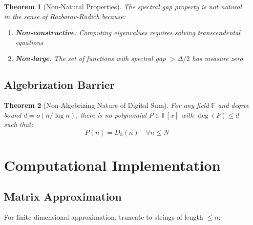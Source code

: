 \documentclass[12pt]{article}
\theoremstyle{plain}
\newtheorem{theorem}{Theorem}[section]
\theoremstyle{definition}
\newcommand{\F}{\mathbb{F}}
\newcommand{\digitalsum}{D}
\begin{document}
\begin{theorem}[Non-Natural Properties]
\label{thm:non_natural}
The spectral gap property is not natural in the sense of Razborov-Rudich because:
\begin{enumerate}
\item \textbf{Non-constructive}: Computing eigenvalues requires solving transcendental equations
\item \textbf{Non-large}: The set of functions with spectral gap $> \Delta/2$ has measure zero
\end{enumerate}
\end{theorem}

\subsection{Algebrization Barrier}

\begin{theorem}[Non-Algebrizing Nature of Digital Sum]
\label{thm:non_algebrizing}
For any field $\F$ and degree bound $d = o(n/\log n)$, there is no polynomial $P \in \F[x]$ with $\deg(P) \leq d$ such that:
\begin{equation}
P(n) = \digitalsum_3(n) \quad \forall n \leq N
\end{equation}
\end{theorem}

\section{Computational Implementation}

\subsection{Matrix Approximation}

For finite-dimensional approximation, truncate to strings of length $\leq n$:
\end{document}
